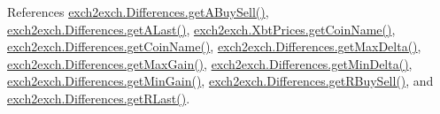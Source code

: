 References \hyperlink{exch2exch_8py_source_l00138}{exch2exch.\+Differences.\+get\+A\+Buy\+Sell()}, \hyperlink{exch2exch_8py_source_l00144}{exch2exch.\+Differences.\+get\+A\+Last()}, \hyperlink{exch2exch_8py_source_l00088}{exch2exch.\+Xbt\+Prices.\+get\+Coin\+Name()}, \hyperlink{exch2exch_8py_source_l00150}{exch2exch.\+Differences.\+get\+Coin\+Name()}, \hyperlink{exch2exch_8py_source_l00129}{exch2exch.\+Differences.\+get\+Max\+Delta()}, \hyperlink{exch2exch_8py_source_l00135}{exch2exch.\+Differences.\+get\+Max\+Gain()}, \hyperlink{exch2exch_8py_source_l00126}{exch2exch.\+Differences.\+get\+Min\+Delta()}, \hyperlink{exch2exch_8py_source_l00132}{exch2exch.\+Differences.\+get\+Min\+Gain()}, \hyperlink{exch2exch_8py_source_l00141}{exch2exch.\+Differences.\+get\+R\+Buy\+Sell()}, and \hyperlink{exch2exch_8py_source_l00147}{exch2exch.\+Differences.\+get\+R\+Last()}.


